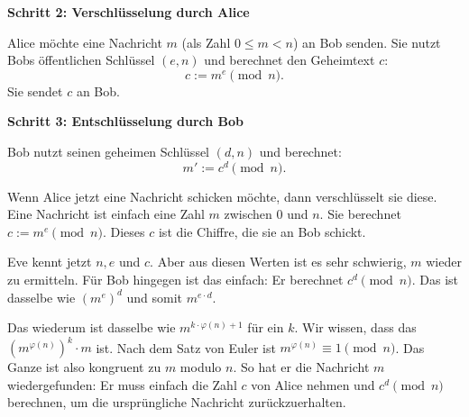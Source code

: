 \begin{math-stroke}
\textbf{Schritt 2: Verschlüsselung durch Alice}

Alice möchte eine Nachricht $m$ (als Zahl $0 \le m < n$) an Bob senden. Sie nutzt Bobs öffentlichen Schlüssel $(e, n)$ und berechnet den Geheimtext $c$:
\begin{equation}\label{eq:rsa-enc}
c := m^e \pmod n.
\end{equation}
Sie sendet $c$ an Bob.

\textbf{Schritt 3: Entschlüsselung durch Bob}

Bob nutzt seinen geheimen Schlüssel $(d, n)$ und berechnet:
\begin{equation}\label{eq:rsa-dec}
m' := c^d \pmod n.
\end{equation}
\end{math-stroke}

\begin{spoken-clean}[01:25:54 - 01:28:02]
Wenn Alice jetzt eine Nachricht schicken möchte, dann verschlüsselt sie diese. Eine Nachricht ist einfach eine Zahl $m$ zwischen $0$ und $n$. Sie berechnet $c := m^e \pmod n$. Dieses $c$ ist die Chiffre, die sie an Bob schickt.

Eve kennt jetzt $n, e$ und $c$. Aber aus diesen Werten ist es sehr schwierig, $m$ wieder zu ermitteln. Für Bob hingegen ist das einfach: Er berechnet $c^d \pmod n$. Das ist dasselbe wie $(m^e)^d$ und somit $m^{e \cdot d}$.

Das wiederum ist dasselbe wie $m^{k \cdot \varphi(n) + 1}$ für ein $k$. Wir wissen, dass das $(m^{\varphi(n)})^k \cdot m$ ist. Nach dem Satz von Euler ist $m^{\varphi(n)} \equiv 1 \pmod n$. Das Ganze ist also kongruent zu $m$ modulo $n$. So hat er die Nachricht $m$ wiedergefunden: Er muss einfach die Zahl $c$ von Alice nehmen und $c^d \pmod n$ berechnen, um die ursprüngliche Nachricht zurückzuerhalten.
\end{spoken-clean}

